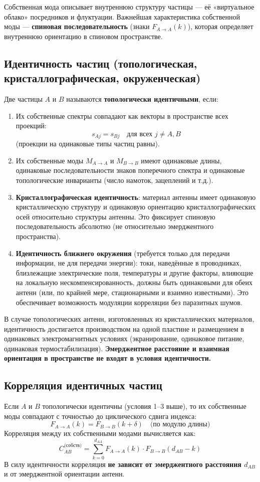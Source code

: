 \documentclass[a4paper,12pt]{article}
\begin{document}
Собственная мода описывает внутреннюю структуру частицы — её «виртуальное облако» посредников и флуктуации. Важнейшая характеристика собственной моды — \textbf{спиновая последовательность} (знаки \(F_{A\to A}(k)\)), которая определяет внутреннюю ориентацию в спиновом пространстве.

\subsection{Идентичность частиц (топологическая, кристаллографическая, окруженческая)}
Две частицы \(A\) и \(B\) называются \textbf{топологически идентичными}, если:
\begin{enumerate}
    \item Их собственные спектры совпадают как векторы в пространстве всех проекций:
    \[
    s_{A j} = s_{B j} \quad \text{для всех } j \neq A,B
    \]
    (проекции на одинаковые типы частиц равны).
    \item Их собственные моды \(M_{A\to A}\) и \(M_{B\to B}\) имеют одинаковые длины, одинаковые последовательности знаков поперечного спектра и одинаковые топологические инварианты (число намоток, зацеплений и т.д.).
    \item \textbf{Кристаллографическая идентичность}: материал антенны имеет одинаковую кристаллическую структуру и одинаковую ориентацию кристаллографических осей относительно структуры антенны. Это фиксирует спиновую последовательность абсолютно (не относительно эмерджентного пространства).
    \item \textbf{Идентичность ближнего окружения} (требуется только для передачи информации, не для передачи энергии): токи, наведённые в проводниках, близлежащие электрические поля, температуры и другие факторы, влияющие на локальную нескомпенсированность, должны быть одинаковыми для обеих антенн (или, по крайней мере, стационарными и взаимно известными). Это обеспечивает возможность модуляции корреляции без паразитных шумов.
\end{enumerate}

В случае топологических антенн, изготовленных из кристаллических материалов, идентичность достигается производством на одной пластине и размещением в одинаковых электромагнитных условиях (экранирование, одинаковое питание, одинаковая термостабилизация). \textbf{Эмерджентное расстояние и взаимная ориентация в пространстве не входят в условия идентичности.}

\subsection{Корреляция идентичных частиц}
Если \(A\) и \(B\) топологически идентичны (условия 1–3 выше), то их собственные моды совпадают с точностью до циклического сдвига индекса:
\[
F_{A\to A}(k) = F_{B\to B}(k + \delta) \quad \text{(по модулю длины)}
\]
Корреляция между их собственными модами вычисляется как:
\[
C_{AB}^{\text{(собств)}} = \sum_{k=0}^{d_{AA}} F_{A\to A}(k) \cdot F_{B\to B}(d_{AB} - k)
\]
В силу идентичности корреляция \textbf{не зависит от эмерджентного расстояния \(d_{AB}\)} и от эмерджентной ориентации антенн.
\end{document}

